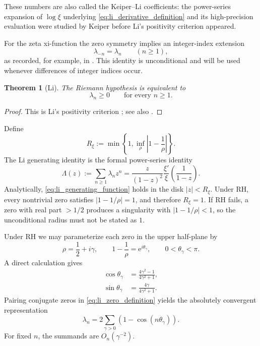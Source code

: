 \documentclass[11pt]{amsart}
\numberwithin{equation}{section}
\theoremstyle{plain}
\newtheorem{theorem}{Theorem}[section]
\theoremstyle{definition}
\theoremstyle{remark}
\newcommand{\RH}{\mathrm{RH}}
\newcommand{\e}{\mathrm e}
\begin{document}
These numbers are also called the Keiper--Li coefficients: the power-series expansion of $\log\xi$ underlying \eqref{eq:li_derivative_definition} and its high-precision evaluation were studied by Keiper \cite{Keiper1992} before Li's positivity criterion appeared.

For the zeta xi-function the zero symmetry implies an integer-index extension
\begin{equation}
\lambda_{-n}=\lambda_n
\qquad(n\ge1),
\label{eq:li_negative_symmetry}
\end{equation}
as recorded, for example, in \cite[Eq.~(1.2)]{Lagarias2007}. This identity is unconditional and will be used whenever differences of integer indices occur.

\begin{theorem}[Li]
\label{thm:li_criterion}
The Riemann hypothesis is equivalent to
\begin{equation}
\lambda_n\ge0
\qquad\text{for every }n\ge1.
\label{eq:li_criterion}
\end{equation}
\end{theorem}

\begin{proof}
This is Li's positivity criterion \cite{Li1997}; see also \cite{BombieriLagarias1999,Lagarias2007}.
\end{proof}

Define
\begin{equation}
R_\xi:=\min\!\left\{1,\inf_{\rho}\left|1-\frac1\rho\right|\right\}.
\label{eq:li_generating_radius}
\end{equation}
The Li generating identity is the formal power-series identity
\begin{equation}
\Lambda(z):=\sum_{n\ge1}\lambda_n z^n
=
\frac{z}{(1-z)^2}
\frac{\xi'}{\xi}\!\left(\frac{1}{1-z}\right).
\label{eq:li_generating_function}
\end{equation}
Analytically, \eqref{eq:li_generating_function} holds in the disk $|z|<R_\xi$. Under $\RH$, every nontrivial zero satisfies $|1-1/\rho|=1$, and therefore $R_\xi=1$. If $\RH$ fails, a zero with real part $>1/2$ produces a singularity with $|1-1/\rho|<1$, so the unconditional radius must not be stated as $1$.

Under $\RH$ we may parameterize each zero in the upper half-plane by
\begin{equation}
\rho=\frac12+i\gamma,
\qquad
1-\frac1\rho=\e^{i\theta_\gamma},
\qquad 0<\theta_\gamma<\pi.
\label{eq:theta_parameterization}
\end{equation}
A direct calculation gives
\begin{align}
\cos\theta_\gamma
&=\frac{4\gamma^2-1}{4\gamma^2+1},
\label{eq:theta_cos}\\
\sin\theta_\gamma
&=\frac{4\gamma}{4\gamma^2+1}.
\label{eq:theta_sin}
\end{align}
Pairing conjugate zeros in \eqref{eq:li_zero_definition} yields the absolutely convergent representation
\begin{equation}
\lambda_n
=2\sum_{\gamma>0}
\left(1-\cos(n\theta_\gamma)\right).
\label{eq:li_cosine_representation}
\end{equation}
For fixed $n$, the summands are $O_n(\gamma^{-2})$.
\end{document}
